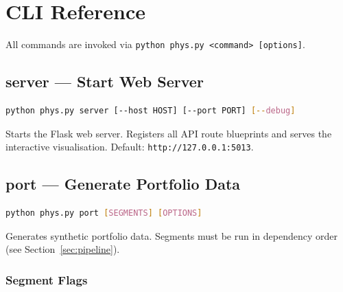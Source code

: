 \documentclass[11pt,a4paper]{article}
\begin{document}
\section{CLI Reference}

All commands are invoked via \texttt{python phys.py <command> [options]}.

\subsection{server --- Start Web Server}

\begin{lstlisting}[language=bash]
python phys.py server [--host HOST] [--port PORT] [--debug]
\end{lstlisting}

Starts the Flask web server. Registers all API route blueprints and serves
the interactive visualisation. Default: \texttt{http://127.0.0.1:5013}.

\subsection{port --- Generate Portfolio Data}

\begin{lstlisting}[language=bash]
python phys.py port [SEGMENTS] [OPTIONS]
\end{lstlisting}

Generates synthetic portfolio data. Segments must be run in dependency order
(see Section~\ref{sec:pipeline}).

\subsubsection{Segment Flags}
\end{document}
